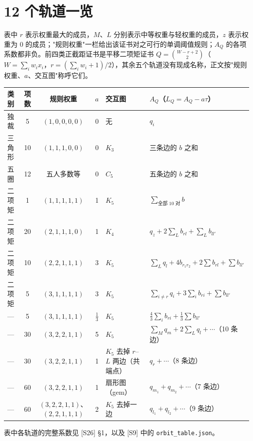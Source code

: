 \documentclass[11pt,a4paper]{article}
\theoremstyle{remark}
\begin{document}
\section{12 个轨道一览}

表中 $r$ 表示权重最大的成员，$M$、$L$ 分别表示中等权重与轻权重的成员，$z$ 表示权重为 0 的成员；"规则权重"一栏给出该证书对之可行的单调阈值规则；$A_Q$ 的各项系数都非负。前四类正截距证书是平移二项矩证书 $Q=\binom{W-r+2}{2}$（$W=\sum_iw_ix_i$，$r=(\sum_iw_i+1)/2$），其余五个轨道没有现成名称，正文按"规则权重、$a$、交互图"称呼它们。

\begin{center}
\footnotesize
\setlength{\tabcolsep}{3pt}
\renewcommand{\arraystretch}{1.25}
\begin{tabular}{@{}l c c c l l@{}}
\toprule
类别 & 项数 & 规则权重 & $a$ & 交互图 & $A_Q$（$L_Q=A_Q-a\tau$） \\
\midrule
独裁 & 5 & $(1,0,0,0,0)$ & 0 & 无 & $q_i$ \\
三角形 & 10 & $(1,1,1,0,0)$ & 0 & $K_3$ & 三条边的 $b$ 之和 \\
五圈 & 12 & 五人多数等 & 0 & $C_5$ & 五条边的 $b$ 之和 \\
\midrule
二项矩 & 1 & $(1,1,1,1,1)$ & 1 & $K_5$ & $\sum_{\text{全部 10 对}}b$ \\
二项矩 & 20 & $(2,1,1,1,0)$ & 1 & $K_4$ & $q_z+2\sum_{L}b_{rl}+\sum_{L}b_{ll'}$ \\
二项矩 & 10 & $(2,2,1,1,1)$ & 3 & $K_5$ & $\sum_Lq_l+4b_{r_1r_2}+2\sum b_{rl}+\sum b_{ll'}$ \\
二项矩 & 5 & $(3,1,1,1,1)$ & 3 & $K_5$ & $\sum_{i\ne r}q_i+3\sum_ib_{ri}+\sum b_{ll'}$ \\
— & 5 & $(3,1,1,1,1)$ & $\tfrac13$ & $K_5$ & $\tfrac43\sum_ib_{ri}+\tfrac13\sum b_{ll'}$ \\
— & 30 & $(3,2,2,1,1)$ & 5 & $K_5$ & $\sum_Mq_m+2\sum_Lq_l+\cdots$（10 条边） \\
— & 30 & $(3,2,2,1,1)$ & 1 & $K_5$ 去掉 $r$–$L$ 两边（共端点） & $q_r+\cdots$（8 条边） \\
— & 60 & $(3,2,2,1,1)$ & 1 & 扇形图（gem） & $q_{m_1}+q_{m_2}+\cdots$（7 条边） \\
— & 60 & $(3,2,2,1,1)$、$(2,2,1,1,1)$ & 2 & $K_5$ 去掉一边 & $q_{l_1}+q_{l_2}+\cdots$（9 条边） \\
\bottomrule
\end{tabular}
\end{center}

表中各轨道的完整系数见 [S26] §1，以及 [S9] 中的 \texttt{orbit\_table.json}。
\end{document}
